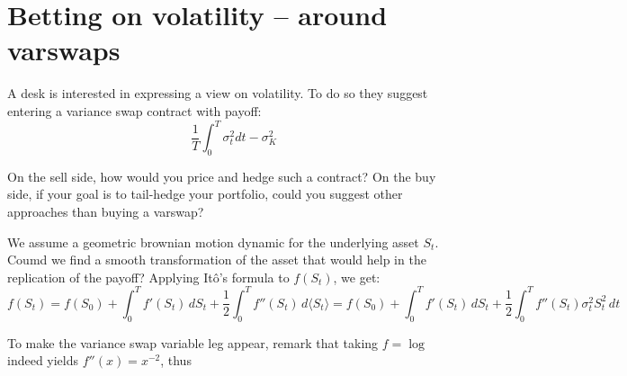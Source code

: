 \section{Betting on volatility -- around varswaps}

\begin{tcolorbox}[width=\linewidth, sharp corners=all, colback=white!95!black]
    A desk is interested in expressing a view on volatility. To do so they suggest entering a variance swap contract with payoff:
    \[\dfrac{1}{T} \displaystyle \int_{0}^{T} \sigma_t^2 dt - \sigma_K^2\]

    On the sell side, how would you price and hedge such a contract?\newline
    On the buy side, if your goal is to tail-hedge your portfolio, could you suggest other approaches than buying a varswap?

\end{tcolorbox}

We assume a geometric brownian motion dynamic for the underlying asset $S_t$. Coumd we find a smooth transformation of the asset that would help in the replication of the payoff? Applying Itô's formula to $f(S_t)$, we get:
\[f(S_t) = f(S_0) + \displaystyle \int_0^T f'(S_t) \,dS_t + \dfrac{1}{2}\displaystyle \int_0^T f''(S_t) \,d\langle S_t\rangle = f(S_0) + \displaystyle \int_0^T f'(S_t) \,dS_t + \dfrac{1}{2}\displaystyle \int_0^T f''(S_t) \sigma_t^2 S_t^2 \,dt\]

To make the variance swap variable leg appear, remark that taking $f = \log$ indeed yields $f''(x) = x^{-2}$, thus 